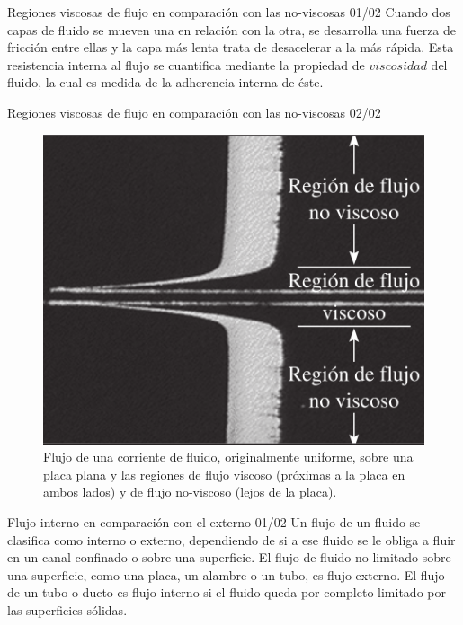 \begin{frame}{Regiones viscosas de flujo en comparación con las no-viscosas 01/02}
\justifying
Cuando dos capas de fluido se mueven una en relación con la otra, se desarrolla una fuerza de fricción entre ellas y la capa más lenta trata de desacelerar a la más rápida. Esta resistencia interna al flujo se cuantifica mediante la propiedad de $viscosidad$ del fluido, la cual es medida de la adherencia interna de éste.
\end{frame}
	
\begin{frame}{Regiones viscosas de flujo en comparación con las no-viscosas 02/02}
\justifying
\begin{figure}[H]
\centering
\includegraphics[scale=0.25]{Section_Files/imagenes/sec01_0101_Fig01-17.png}
\caption{Flujo de una corriente de fluido, originalmente uniforme, sobre una placa plana y las regiones de flujo viscoso (próximas a la placa en ambos lados) y de flujo no-viscoso (lejos de la placa).}
\label{fig: Figura1-17}
\end{figure}
\end{frame}
	
\begin{frame}{Flujo interno en comparación con el externo 01/02}
\justifying
Un flujo de un fluido se clasifica como interno o externo, dependiendo de si a ese fluido se le obliga a fluir en un canal confinado o sobre una superficie. El flujo de fluido no limitado sobre una superficie, como una placa, un alambre o un tubo, es flujo externo. El flujo de un tubo o ducto es flujo interno si el fluido queda por completo limitado por las superficies sólidas.
\end{frame}
	
